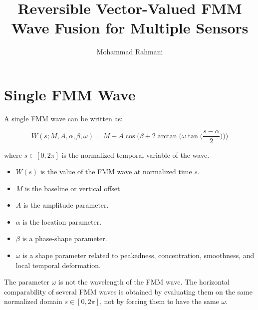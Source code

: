 \documentclass[a4paper]{article}
\title{Reversible Vector-Valued FMM Wave Fusion for Multiple Sensors}
\date{}
\author{Mohammad Rahmani}
\begin{document}
    \maketitle
    
    
    \section{Single FMM Wave}
        
        A single FMM wave can be written as:
        
        \begin{equation}
            W(s;M,A,\alpha,\beta,\omega)
            =
            M
            +
            A
            \cos
            \biggl(
            \beta
            +
            2
            \arctan
            \biggl(
            \omega
            \tan
            \biggl(
            \frac{s-\alpha}{2}
            \biggr)
            \biggr)
            \biggr)
        \end{equation}
        
        where \(s \in [0,2\pi]\) is the normalized temporal variable of the wave.
        
        \begin{itemize}
            \item \(W(s)\) is the value of the FMM wave at normalized time \(s\).
            
            \item \(M\) is the baseline or vertical offset.
            
            \item \(A\) is the amplitude parameter.
            
            \item \(\alpha\) is the location parameter.
            
            \item \(\beta\) is a phase-shape parameter.
            
            \item \(\omega\) is a shape parameter related to peakedness, concentration, smoothness, and local temporal deformation.
        \end{itemize}
        
        The parameter \(\omega\) is not the wavelength of the FMM wave.
        The horizontal comparability of several FMM waves is obtained by evaluating them on the same normalized domain \(s \in [0,2\pi]\), not by forcing them to have the same \(\omega\).
        
\end{document}

